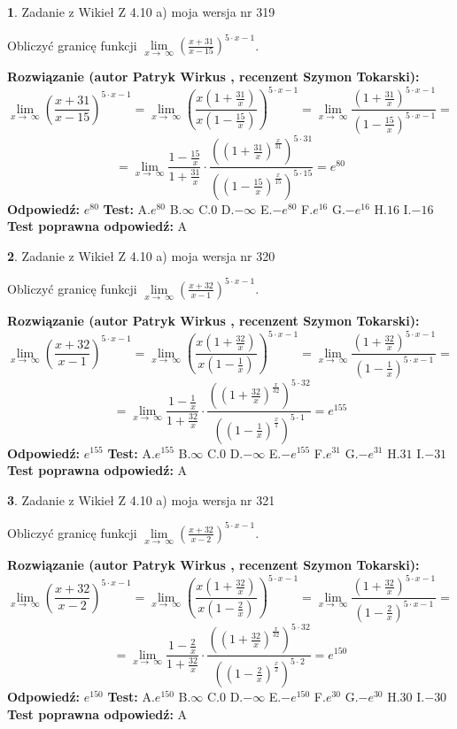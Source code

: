 \documentclass[12pt, a4paper]{article}
\theoremstyle{definition} %
\newtheorem{zad}{}
\newcommand{\zadStart}[1]{\begin{zad}#1\newline}
\newcommand{\zadStop}{\end{zad}}
\newcommand{\rozwStart}[2]{\noindent \textbf{Rozwiązanie (autor #1 , recenzent #2): }\newline}
\newcommand{\rozwStop}{\newline}
\newcommand{\odpStart}{\noindent \textbf{Odpowiedź:}\newline}
\newcommand{\odpStop}{\newline}
\newcommand{\testStart}{\noindent \textbf{Test:}\newline}
\newcommand{\testStop}{\newline}
\newcommand{\kluczStart}{\noindent \textbf{Test poprawna odpowiedź:}\newline}
\newcommand{\kluczStop}{\newline}
\begin{document}
\zadStart{Zadanie z Wikieł Z 4.10 a) moja wersja nr 319}

Obliczyć granicę funkcji  $\lim\limits_{x\to\ \infty}(\frac{x+31}{x-15})^{5\cdot x-1}$.
\zadStop
\rozwStart{Patryk Wirkus}{Szymon Tokarski}
$$\lim\limits_{x\to\ \infty}(\frac{x+31}{x-15})^{5\cdot x-1} = \lim\limits_{x\to\ \infty}(\frac{x(1+\frac{31}{x})}{x(1-\frac{15}{x})})^{5\cdot x-1}=\lim\limits_{x\to\ \infty}\frac{(1+\frac{31}{x})^{5\cdot x-1}}{(1-\frac{15}{x})^{5\cdot x-1}}=$$
$$=\lim\limits_{x\to\ \infty}\frac{1-\frac{15}{x}}{1+\frac{31}{x}}\cdot\frac{((1+\frac{31}{x})^{\frac{x}{31}})^{5\cdot31}}{((1-\frac{15}{x})^{\frac{x}{15}})^{5\cdot15}}=e^{80}$$
\rozwStop
\odpStart
$e^{80}$
\odpStop
\testStart
A.$e^{80}$ B.$\infty$ C.$0$ D.$-\infty$ E.$-e^{80}$
F.$e^{16}$ G.$-e^{16}$
H.$16$
I.$-16$
\testStop
\kluczStart
A
\kluczStop



\zadStart{Zadanie z Wikieł Z 4.10 a) moja wersja nr 320}

Obliczyć granicę funkcji  $\lim\limits_{x\to\ \infty}(\frac{x+32}{x-1})^{5\cdot x-1}$.
\zadStop
\rozwStart{Patryk Wirkus}{Szymon Tokarski}
$$\lim\limits_{x\to\ \infty}(\frac{x+32}{x-1})^{5\cdot x-1} = \lim\limits_{x\to\ \infty}(\frac{x(1+\frac{32}{x})}{x(1-\frac{1}{x})})^{5\cdot x-1}=\lim\limits_{x\to\ \infty}\frac{(1+\frac{32}{x})^{5\cdot x-1}}{(1-\frac{1}{x})^{5\cdot x-1}}=$$
$$=\lim\limits_{x\to\ \infty}\frac{1-\frac{1}{x}}{1+\frac{32}{x}}\cdot\frac{((1+\frac{32}{x})^{\frac{x}{32}})^{5\cdot32}}{((1-\frac{1}{x})^{\frac{x}{1}})^{5\cdot1}}=e^{155}$$
\rozwStop
\odpStart
$e^{155}$
\odpStop
\testStart
A.$e^{155}$ B.$\infty$ C.$0$ D.$-\infty$ E.$-e^{155}$
F.$e^{31}$ G.$-e^{31}$
H.$31$
I.$-31$
\testStop
\kluczStart
A
\kluczStop



\zadStart{Zadanie z Wikieł Z 4.10 a) moja wersja nr 321}

Obliczyć granicę funkcji  $\lim\limits_{x\to\ \infty}(\frac{x+32}{x-2})^{5\cdot x-1}$.
\zadStop
\rozwStart{Patryk Wirkus}{Szymon Tokarski}
$$\lim\limits_{x\to\ \infty}(\frac{x+32}{x-2})^{5\cdot x-1} = \lim\limits_{x\to\ \infty}(\frac{x(1+\frac{32}{x})}{x(1-\frac{2}{x})})^{5\cdot x-1}=\lim\limits_{x\to\ \infty}\frac{(1+\frac{32}{x})^{5\cdot x-1}}{(1-\frac{2}{x})^{5\cdot x-1}}=$$
$$=\lim\limits_{x\to\ \infty}\frac{1-\frac{2}{x}}{1+\frac{32}{x}}\cdot\frac{((1+\frac{32}{x})^{\frac{x}{32}})^{5\cdot32}}{((1-\frac{2}{x})^{\frac{x}{2}})^{5\cdot2}}=e^{150}$$
\rozwStop
\odpStart
$e^{150}$
\odpStop
\testStart
A.$e^{150}$ B.$\infty$ C.$0$ D.$-\infty$ E.$-e^{150}$
F.$e^{30}$ G.$-e^{30}$
H.$30$
I.$-30$
\testStop
\kluczStart
A
\kluczStop
\end{document}
